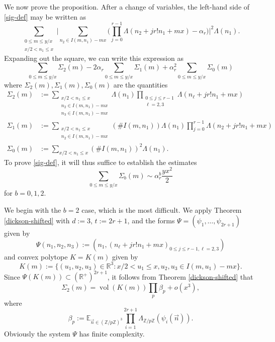 \documentclass[12pt]{amsart}
\numberwithin{equation}{section}  %
\theoremstyle{remark}
\theoremstyle{plain}
\numberwithin{equation}{section}
\newcommand{\Z}{\mathbb{Z}}
\newcommand{\R}{\mathbb{R}}
\newcommand{\E}{\mathbb{E}}  %
\renewcommand{\le}{\leqslant}
\renewcommand{\leq}{\leqslant}
\renewcommand{\(}{\left(}
\renewcommand{\)}{\right)}
\newcommand{\asym}{\sim}   %
\newcommand{\vect}[1]{{\ensuremath{\vec{#1}}}}
\newcommand{\vol}{\operatorname{vol}}
\begin{document}
We now prove the proposition.  After a change of variables, the left-hand side of \eqref{sig-def} may be written as
\[
\sum_{\substack{0 \leq m \leq y/x \\x/2 < n_1 \le x}} \Bigg|\sum_{n_2 \in I(m, n_1) - mx } \Bigg(\prod_{j = 0}^{r-1}\Lambda(n_2 + jr! n_1 + mx)  - \alpha_r\Bigg) \Bigg|^2 \Lambda(n_1).\]
Expanding out the square, we can write this expression as
\[ \sum_{0 \leq m \leq y/x} \Sigma_2(m) - 2\alpha_r \sum_{0 \leq m
  \leq y/x} \Sigma_1(m) + \alpha_r^2 \sum_{0 \leq m \leq y/x}
\Sigma_0(m)\]
 where $\Sigma_2(m), \Sigma_1(m), \Sigma_0(m)$ are the quantities
\begin{align*}
\Sigma_2(m)  &:=  \sum_{\substack{x/2 < n_1 \le x \\n_2 \in I(m, n_1) - mx \\ n_3 \in I(m,n_1) - mx }}  \Lambda(n_1) \prod_{\substack{0 \leq j \leq r-1 \\ \ell = 2,3}}\Lambda(n_{\ell} + jr! n_1 + mx)\\
\Sigma_1(m) &:=  \sum_{\substack{x/2 < n_1 \le x \\ n_2 \in I(m, n_1) - mx }} (\# I(m,n_1)) \Lambda(n_1)  \prod_{j = 0}^{r-1} \Lambda(n_2 + jr! n_1 + mx)\\
\Sigma_0(m) &:= \sum_{x/2 < n_1 \le x} (\# I(m,n_1))^2 \Lambda(n_1).
\end{align*}
To prove \eqref{sig-def}, it will thus suffice to establish the estimates
\begin{equation}\label{sigo}
\sum_{0 \leq m \leq y/x} \Sigma_b(m) \asym \alpha_r^b \frac{yx^2}{2}
\end{equation}
for $b=0,1,2$.

We begin with the $b=2$ case, which is the most difficult.  We apply Theorem \ref{dickson-shifted} with $d := 3$, $t := 2r + 1$, and the forms $\Psi = (\psi_1,\dots, \psi_{2r+1})$ given by
\[ \Psi(n_1,n_2,n_3) := (n_1,  (n_{\ell} + jr! n_1 + mx)_{0 \leq j \leq r-1, \ell =
  2,3})\] and convex polytope $K = K(m)$ given by
\[ K(m) := \{ (u_1,u_2,u_3) \in \R^3 : x/2 < u_1 \le x, u_2,u_3 \in I(m,u_1) - mx \}. \]
 Since $\Psi(K(m)) \subset (\R^{+})^{2r + 1}$, it follows from Theorem \ref{dickson-shifted} that
\begin{equation}\label{sig-2m} \Sigma_2(m) = \vol(K(m)) \prod_p \beta_p + o(x^3),\end{equation}
where
\[ \beta_p := \E_{\vect{n} \in (\Z/p\Z)^3} \prod_{i = 1}^{2r +1} \Lambda_{\Z/p\Z}(\psi_i(\vect{n})).\]
Obviously the system $\Psi$ has finite complexity.
\end{document}
